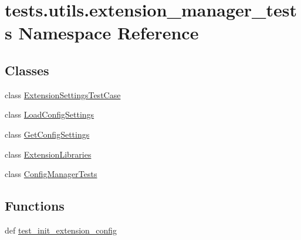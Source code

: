 \hypertarget{namespacetests_1_1utils_1_1extension__manager__tests}{\section{tests.\-utils.\-extension\-\_\-manager\-\_\-tests Namespace Reference}
\label{namespacetests_1_1utils_1_1extension__manager__tests}
}
\subsection*{Classes}
\begin{DoxyCompactItemize}
\item 
class \hyperlink{classtests_1_1utils_1_1extension__manager__tests_1_1ExtensionSettingsTestCase}{Extension\-Settings\-Test\-Case}
\item 
class \hyperlink{classtests_1_1utils_1_1extension__manager__tests_1_1LoadConfigSettings}{Load\-Config\-Settings}
\item 
class \hyperlink{classtests_1_1utils_1_1extension__manager__tests_1_1GetConfigSettings}{Get\-Config\-Settings}
\item 
class \hyperlink{classtests_1_1utils_1_1extension__manager__tests_1_1ExtensionLibraries}{Extension\-Libraries}
\item 
class \hyperlink{classtests_1_1utils_1_1extension__manager__tests_1_1ConfigManagerTests}{Config\-Manager\-Tests}
\end{DoxyCompactItemize}
\subsection*{Functions}
\begin{DoxyCompactItemize}
\item 
def \hyperlink{namespacetests_1_1utils_1_1extension__manager__tests_a369ad0d8b9b3bbcba076f242c0eeec0e}{test\-\_\-init\-\_\-extension\-\_\-config}
\end{DoxyCompactItemize}


